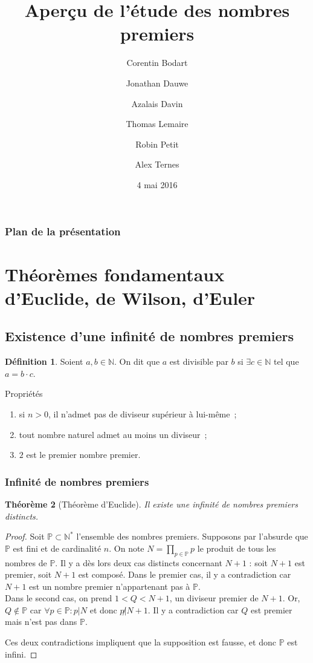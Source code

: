 \documentclass[10pt, mathserif]{beamer}
\title{Aperçu de l'étude des nombres premiers}
\author{ Corentin Bodart%
	\and Jonathan Dauwe %
	\and Azalais Davin %
	\and Thomas Lemaire %
	\and Robin Petit %
	\and Alex Ternes}
\date{4 mai 2016}
\institute{Université Libre de Bruxelles}
\newcommand{\N}{\mathbb N}
\renewcommand{\P}{\mathbb P}
\newtheorem{thm}{Théorème}[section]
\theoremstyle{definition}
\newtheorem{déf}[thm]{Définition}
\theoremstyle{remark}
\begin{document}
	\frame{\titlepage}

	\begin{frame}
		\frametitle{Plan de la présentation}
		\tableofcontents
	\end{frame}

\section{Théorèmes fondamentaux d'Euclide, de Wilson, d'Euler}
	\subsection{Existence d'une infinité de nombres premiers}
	\begin{frame}
		\begin{déf}
			Soient $a, b \in \N$. On dit que $a$ est divisible par $b$ si $\exists c \in \N$ tel que $a = b \cdot c$.
		\end{déf}

		\begin{block}{Propriétés}
			\begin{enumerate}
				\item si $n > 0$, il n'admet pas de diviseur supérieur à lui-même~;
				\item tout nombre naturel admet au moins un diviseur~;
				\item $2$ est le premier nombre premier.
			\end{enumerate}
		\end{block}
	\end{frame}

	\begin{frame}
		\frametitle{Infinité de nombres premiers}
		\begin{thm}[Théorème d'Euclide]
			Il existe une infinité de nombres premiers distincts.
		\end{thm}

		\begin{proof}
			Soit $\P \subset \N^*$ l'ensemble des nombres premiers. Supposons par l'absurde que $\P$ est fini et de cardinalité $n$.
			On note $N = \prod_{p \in \P}p$ le produit de tous les nombres de $\P$. Il y a dès lors deux cas distincts concernant $N+1$ :
			soit $N+1$ est premier, soit $N+1$ est composé. Dans le premier cas, il y a contradiction car $N+1$ est un nombre premier n'appartenant pas à $\P$. \\
			Dans le second cas, on prend $1 < Q < N+1$, un diviseur premier de $N+1$. Or, $Q \not \in \P$ car $\forall p \in \P : p | N$ et donc
			$p \not | N+1$. Il y a contradiction car $Q$ est premier mais n'est pas dans $\P$.

			Ces deux contradictions impliquent que la supposition est fausse, et donc $\P$ est infini.
		\end{proof}
	\end{frame}
\end{document}
